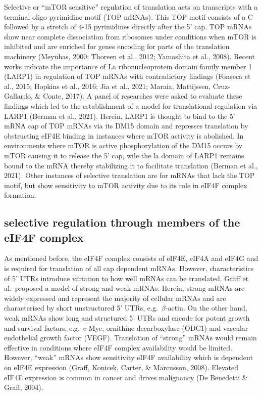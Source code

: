 \documentclass[
  12pt,
  openany]{book}
\begin{document}
Selective or ``mTOR sensitive'' regulation of translation acts on transcripts with a terminal oligo pyrimidine motif (TOP mRNAs). This TOP motif consists of a C followed by a stretch of 4-15 pyrimidines directly after the 5' cap. TOP mRNAs show near complete dissociation from ribosomes under conditions when mTOR is inhibited and are enriched for genes encoding for parts of the translation machinery (Meyuhas, 2000; Thoreen et al., 2012; Yamashita et al., 2008). Recent works indicate the importance of La ribonucleoprotein domain family member 1 (LARP1) in regulation of TOP mRNAs with contradictory findings (Fonseca et al., 2015; Hopkins et al., 2016; Jia et al., 2021; Maraia, Mattijssen, Cruz-Gallardo, \& Conte, 2017). A panel of researches were asked to evaluate these findings which led to the establishment of a model for translational regulation via LARP1 (Berman et al., 2021). Herein, LARP1 is thought to bind to the 5' mRNA cap of TOP mRNAs via its DM15 domain and represses translation by obstructing eIF4E binding in instances where mTOR activity is abolished. In environments where mTOR is active phosphorylation of the DM15 occurs by mTOR causing it to release the 5' cap, wile the la domain of LARP1 remains bound to the mRNA thereby stabilizing it to facilitate translation (Berman et al., 2021). Other instances of selective translation are for mRNAs that lack the TOP motif, but show sensitivity to mTOR activity due to its role in eIF4F complex formation.

\subsection{selective regulation through members of the eIF4F complex}

As mentioned before, the eIF4F complex consists of eIF4E, eIF4A and eIF4G and is required for translation of all cap dependent mRNAs. However, characteristics of 5' UTRs introduce variation to how well mRNAs can be translated. Graff et al.~proposed a model of strong and weak mRNAs. Herein, strong mRNAs are widely expressed and represent the majority of cellular mRNAs and are characterised by short unstructured 5' UTRs, e.g.~\(\beta\)-actin. On the other hand, weak mRNAs show long and structured 5' UTRs and encode for potent growth and survival factors, e.g.~c-Myc, ornithine decarboxylase (ODC1) and vascular endothelial growth factor (VEGF). Translation of ``strong'' mRNAs would remain effective in conditions where eIF4F complex availability would be limited. However, ``weak'' mRNAs show sensitivity eIF4F availability which is dependent on eIF4E expression (Graff, Konicek, Carter, \& Marcusson, 2008). Elevated eIF4E expression is common in cancer and drives malignancy (De Benedetti \& Graff, 2004).
\end{document}
